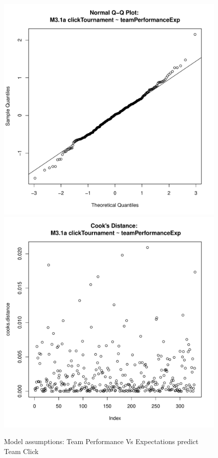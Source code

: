 {\begin{figure}[htbp]
   \includegraphics[scale =.4]{images/MLM31aQQNorm.pdf}
   \includegraphics[scale =.4]{images/MLM31aCooksD.pdf}
   \caption{Model assumptions: Team Performance Vs Expectations predict Team Click}
   \label{fig:MLM31aAssumptions}
 \end{figure}















}
